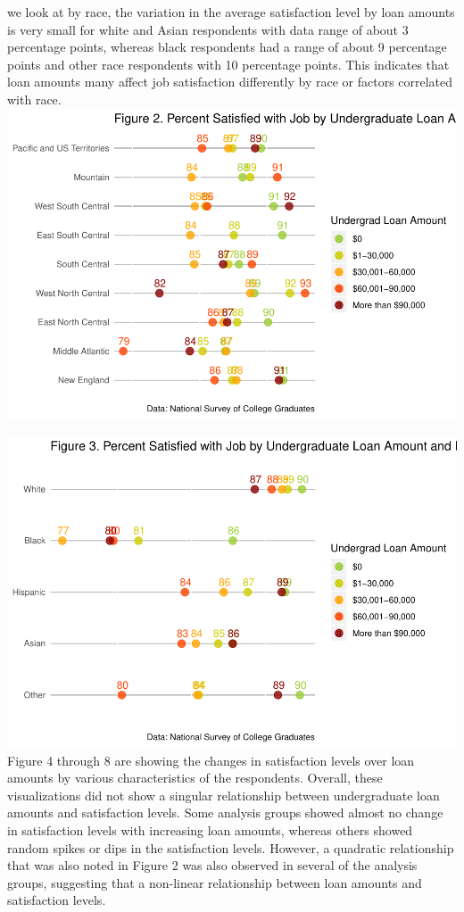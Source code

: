 \documentclass[]{article}
\begin{document}
we look at by race, the variation in the average satisfaction level by
loan amounts is very small for white and Asian respondents with data
range of about 3 percentage points, whereas black respondents had a
range of about 9 percentage points and other race respondents with 10
percentage points. This indicates that loan amounts many affect job
satisfaction differently by race or factors correlated with race.
\includegraphics{Report_Draft_04282019_files/figure-latex/unnamed-chunk-3-1.pdf}

\includegraphics{Report_Draft_04282019_files/figure-latex/unnamed-chunk-4-1.pdf}
Figure 4 through 8 are showing the changes in satisfaction levels over
loan amounts by various characteristics of the respondents. Overall,
these visualizations did not show a singular relationship between
undergraduate loan amounts and satisfaction levels. Some analysis groups
showed almost no change in satisfaction levels with increasing loan
amounts, whereas others showed random spikes or dips in the satisfaction
levels. However, a quadratic relationship that was also noted in Figure
2 was also observed in several of the analysis groups, suggesting that a
non-linear relationship between loan amounts and satisfaction levels.
\end{document}
